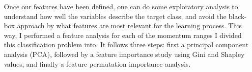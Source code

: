 Once our features have been defined, one can do some exploratory analysis to understand how well the variables describe the target class, and avoid the black-box approach by what features are most relevant for the learning process. This way, I performed a feature analysis for each of the momentum ranges I divided this classification problem into. It follows three steps: first a principal component analysis (PCA), followed by a feature importance study using Gini and Shapley values, and finally a feature permutation importance analysis.

